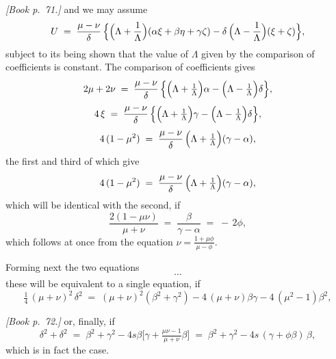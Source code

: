 \documentclass[11pt]{article}
\begin{document}
\bigskip

\noindent\emph{[Book p.~71.]} and we may assume
\[
U \;=\; \frac{\mu - \nu}{\delta}\,\Bigl\{\Bigl(\Lambda + \frac{1}{\Lambda}\Bigr)(\alpha\xi + \beta\eta + \gamma\zeta) - \delta\,\Bigl(\Lambda - \frac{1}{\Lambda}\Bigr)(\xi + \zeta)\Bigr\},
\]
subject to its being shown that the value of $\Lambda$ given by the comparison of coefficients is constant. The comparison of coefficients gives
\[
2\mu + 2\nu \;=\; \frac{\mu - \nu}{\delta}\,\Bigl\{\Bigl(\Lambda + \tfrac{1}{\Lambda}\Bigr)\alpha - \Bigl(\Lambda - \tfrac{1}{\Lambda}\Bigr)\delta\Bigr\},
\]
\[
4\,\xi \;=\; \frac{\mu - \nu}{\delta}\,\Bigl\{\Bigl(\Lambda + \tfrac{1}{\Lambda}\Bigr)\gamma - \Bigl(\Lambda - \tfrac{1}{\Lambda}\Bigr)\delta\Bigr\},
\]
\[
4\,(1 - \mu^{2}) \;=\; \frac{\mu - \nu}{\delta}\,\Bigl(\Lambda + \tfrac{1}{\Lambda}\Bigr)(\gamma - \alpha),
\]
the first and third of which give
\[
4\,(1 - \mu^{2}) \;=\; \frac{\mu - \nu}{\delta}\,\Bigl(\Lambda + \tfrac{1}{\Lambda}\Bigr)(\gamma - \alpha),
\]
which will be identical with the second, if
\[
\frac{2(1 - \mu\nu)}{\mu + \nu} \;=\; \frac{\beta}{\gamma - \alpha} \;=\; -\,2\phi,
\]
which follows at once from the equation $\nu = \tfrac{1 + \mu\phi}{\mu - \phi}$.

Forming next the two equations
\[
\cdots
\]
these will be equivalent to a single equation, if
\[
\tfrac{1}{4}\,(\mu + \nu)^{2}\,\delta^{2} \;=\; (\mu + \nu)^{2}(\beta^{2} + \gamma^{2}) - 4\,(\mu + \nu)\beta\gamma - 4\,(\mu^{2} - 1)\beta^{2},
\]

\bigskip

\noindent\emph{[Book p.~72.]} or, finally, if
\[
\delta^{2} + \delta^{2} \;=\; \beta^{2} + \gamma^{2} - 4s\beta\bigl[\gamma + \tfrac{\mu\nu - 1}{\mu + \nu}\beta\bigr] \;=\; \beta^{2} + \gamma^{2} - 4s\,(\gamma + \phi\beta)\,\beta,
\]
which is in fact the case.
\end{document}
